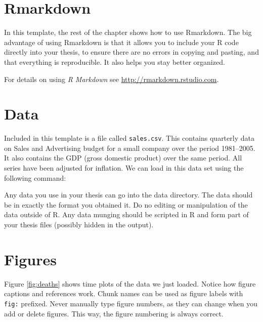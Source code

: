 \documentclass[doubleside,doublespace]{aucklandthesis}
\begin{document}
\hypertarget{rmarkdown}{%
\section{Rmarkdown}\label{rmarkdown}}

In this template, the rest of the chapter shows how to use Rmarkdown. The big advantage of using Rmarkdown is that it allows you to include your R code directly into your thesis, to ensure there are no errors in copying and pasting, and that everything is reproducible. It also helps you stay better organized.

For details on using \emph{R Markdown} see \url{http://rmarkdown.rstudio.com}.

\hypertarget{data}{%
\section{Data}\label{data}}

Included in this template is a file called \texttt{sales.csv}. This contains quarterly data on Sales and Advertising budget for a small company over the period 1981--2005. It also contains the GDP (gross domestic product) over the same period. All series have been adjusted for inflation. We can load in this data set using the following command:

\begin{Shaded}
\begin{Highlighting}[]
\OtherTok{\textless{}{-}} \NormalTok{(}\NormalTok{(}\NormalTok{)[,}\SpecialCharTok{{-}}\NormalTok{], }\NormalTok{, }\NormalTok{)}
\end{Highlighting}
\end{Shaded}

Any data you use in your thesis can go into the data directory. The data should be in exactly the format you obtained it. Do no editing or manipulation of the data outside of R. Any data munging should be scripted in R and form part of your thesis files (possibly hidden in the output).

\hypertarget{figures}{%
\section{Figures}\label{figures}}

Figure \ref{fig:deaths} shows time plots of the data we just loaded. Notice how figure captions and references work. Chunk names can be used as figure labels with \texttt{fig:} prefixed. Never manually type figure numbers, as they can change when you add or delete figures. This way, the figure numbering is always correct.
\end{document}
